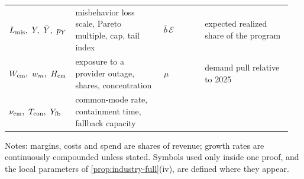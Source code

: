 \begin{table}[p]
\begin{tabular}{@{}p{0.15\linewidth}p{0.325\linewidth}p{0.15\linewidth}p{0.325\linewidth}@{}}
$L_{\rm mis},\ Y,\ \bar Y,\ p_Y$ & misbehavior loss scale, Pareto multiple, cap, tail index & $\bar b\,\mathcal E$ & expected realized share of the program\\
$W_{\rm cm},\ w_m,\ H_{\rm cm}$ & exposure to a provider outage, shares, concentration & $\mu$ & demand pull relative to 2025\\
$\nu_{\rm cm},\ T_{\rm con},\ Y_{\rm fb}$ & common-mode rate, containment time, fallback capacity & & \\
\bottomrule
\end{tabular}

\smallskip
\begin{minipage}{0.97\linewidth}\scriptsize
Notes: margins, costs and spend are shares of revenue; growth rates are continuously compounded unless stated. Symbols used only inside one proof, and the local parameters of \autoref{prop:industry-full}(iv), are defined where they appear.
\end{minipage}
\end{table}

